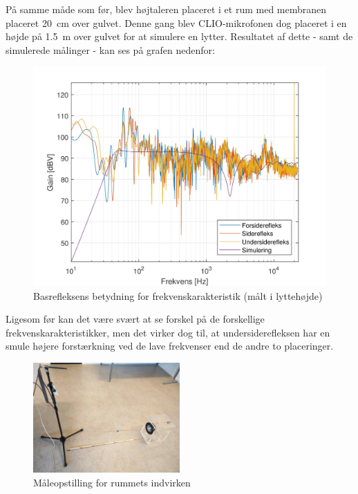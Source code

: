 \newpage
På samme måde som før, blev højtaleren placeret i et rum med membranen placeret \SI{20}{\centi\meter} over gulvet. Denne gang blev CLIO-mikrofonen dog placeret i en højde på \SI{1,5}{\meter} over gulvet for at simulere en lytter. Resultatet af dette - samt de simulerede målinger - kan ses på grafen nedenfor:
\begin{figure}[H]
	\centering
	\vspace{-12pt}
	\includegraphics[width=\textwidth]{Billeder/Grafer/RealListen}
	\caption{Basrefleksens betydning for frekvenskarakteristik (målt i lyttehøjde)}
\end{figure}

Ligesom før kan det være svært at se forskel på de forskellige frekvenskarakteristikker, men det virker dog til, at undersiderefleksen har en smule højere forstærkning ved de lave frekvenser end de andre to placeringer.
\begin{figure}[H]
	\centering
	\includegraphics[width=0.5\textwidth]{Billeder/RealMaaling}
	\caption{Måleopstilling for rummets indvirken}
\end{figure}